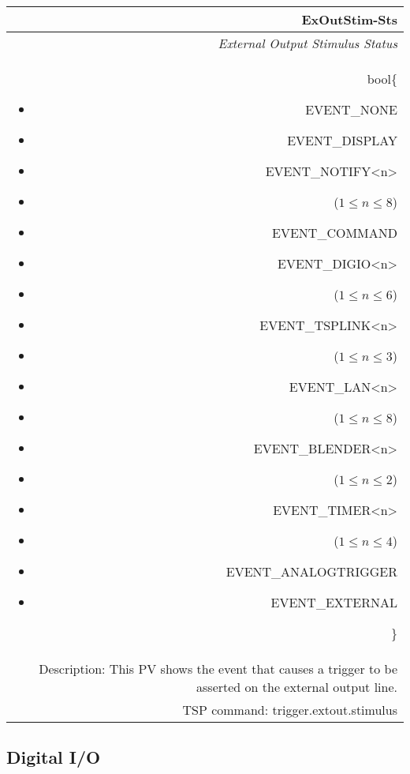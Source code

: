 \documentclass[openany]{article}
\begin{document}
		\begin{tabular}{N}
			\hline
			\bfseries ExOutStim-Sts\label{pv:exoutstim-sts} \\ \hline
			\emph{External Output Stimulus Status} \\
			bool\{\begin{itemize}[noitemsep]
				\small
				\item[] EVENT\_NONE
				\item[] EVENT\_DISPLAY
				\item[] EVENT\_NOTIFY\textless n\textgreater
				\item[] ($1\leq n\leq 8$)
				\item[] EVENT\_COMMAND
				\item[] EVENT\_DIGIO\textless n\textgreater
				\item[] ($1\leq n\leq 6$)
				\item[] EVENT\_TSPLINK\textless n\textgreater
				\item[] ($1\leq n\leq 3$)
				\item[] EVENT\_LAN\textless n\textgreater
				\item[] ($1\leq n\leq 8$)
				\item[] EVENT\_BLENDER\textless n\textgreater 
				\item[] ($1\leq n\leq 2$)
				\item[] EVENT\_TIMER\textless n\textgreater
				\item[] ($1\leq n\leq 4$)
				\item[] EVENT\_ANALOGTRIGGER
				\item[] EVENT\_EXTERNAL
			\end{itemize}\} \\
			Description: This PV shows the event that causes a trigger to be asserted on the external output line. \\
			TSP command: trigger.extout.stimulus
		\end{tabular}

	\subsection{Digital I/O}\label{pvgroup:digital-io}

		\paragraph{} %
\end{document}
